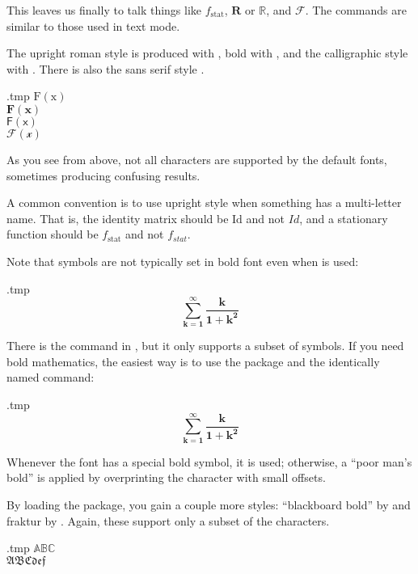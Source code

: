 This leaves us finally to talk things like $f_{\mathrm{stat}}$,
$\mathbf R$ or $\mathbb R$, and $\mathcal F$.
The commands are similar to those used in text mode.

The upright roman style is produced with ,
bold with ,
and the calligraphic style with .
There is also the sans serif style .
%
\begin{VerbatimOut}{\jobname.tmp}
$\mathrm{F(x)}$\\
$\mathbf{F(x)}$\\
$\mathsf{F(x)}$\\
$\mathcal{F(x)}$
\end{VerbatimOut}
\ShowExample
%
As you see from above, not all characters are supported by the default fonts,
sometimes producing confusing results.

\begin{practices}
A common convention is to use upright style when something has a multi-letter name.
That is, the identity matrix should be $\mathrm{Id}$ and not $Id$,
and a stationary function should be $f_{\mathrm{stat}}$ and not $f_{stat}$.
\end{practices}

Note that symbols are not typically set in bold font even when  is used:
%
\begin{VerbatimOut}{\jobname.tmp}
\[
\mathbf{\sum_{k=1}^\infty \frac{k}{1+k^2}}
\]
\end{VerbatimOut}
\ShowExample
%
There is the  command in ,
but it only supports a subset of symbols.
If you need bold mathematics, the easiest way is to use the  package
and the identically named command:
%
\begin{VerbatimOut}{\jobname.tmp}
\[
\bm{\sum_{k=1}^\infty \frac{k}{1+k^2}}
\]
\end{VerbatimOut}
\ShowExample
%
Whenever the font has a special bold symbol, it is used;
otherwise, a ``poor man's bold'' is applied by overprinting the character with small offsets.


By loading the  package, you gain a couple more styles:
``blackboard bold'' by  and fraktur by .
Again, these support only a subset of the characters.
%
\begin{VerbatimOut}{\jobname.tmp}
$\mathbb{ABC}$\\
$\mathfrak{ABCdef}$
\end{VerbatimOut}
\ShowExample

